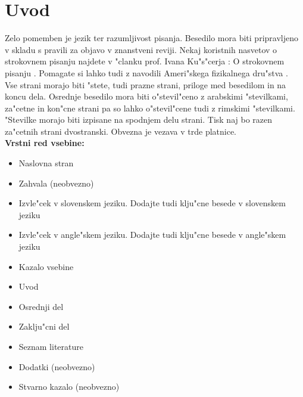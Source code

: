 \chapter{Uvod}
\label{chUvo}

Zelo pomemben je jezik ter razumljivost pisanja. Besedilo mora biti pripravljeno 
v skladu s pravili za objavo v znanstveni reviji.  Nekaj koristnih nasvetov 
o strokovnem pisanju najdete v "clanku prof. Ivana Ku"s"cerja : O strokovnem pisanju 
\cite{Ku}.  Pomagate si lahko tudi z navodili Ameri"skega fizikalnega dru"stva 
\cite{APS}.\\

Vse strani morajo biti "stete, tudi prazne strani, priloge med besedilom in na koncu 
dela.  Osrednje besedilo mora biti o"stevil"ceno z arabskimi "stevilkami, za"cetne 
in kon"cne strani pa so lahko o"stevil"cene tudi z rimskimi "stevilkami.  "Stevilke 
morajo biti izpisane na spodnjem delu strani. Tisk naj bo razen za"cetnih strani 
dvostranski.  Obvezna je vezava v trde platnice.\\

{\bf Vrstni red vsebine:}

\begin{itemize}[noitemsep]
\item{Naslovna stran}
\item{Zahvala (neobvezno)}
\item{Izvle"cek v slovenskem jeziku. Dodajte tudi klju"cne besede v slovenskem jeziku}
\item{Izvle"cek v angle"skem jeziku. Dodajte tudi klju"cne besede v angle"skem jeziku}
\item{Kazalo vsebine}
\item{Uvod}
\item{Osrednji del}
\item{Zaklju"cni del}
\item{Seznam literature}
\item{Dodatki (neobvezno)}
\item{Stvarno kazalo (neobvezno)}
\end{itemize}

